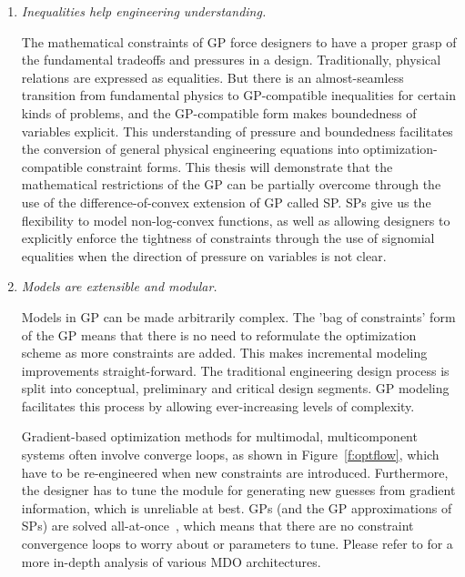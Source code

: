 \begin{enumerate}

    \item \textit{Inequalities help engineering understanding.}

    The mathematical constraints of \gls{GP} force designers to have a proper grasp
    of the fundamental tradeoffs and pressures in a design.
    Traditionally, physical relations are expressed as equalities. But there is an
    almost-seamless transition from fundamental physics to GP-compatible
    inequalities for certain kinds of problems, and the \gls{GP}-compatible
    form makes boundedness of variables explicit. This understanding of pressure
    and boundedness facilitates the conversion of general physical engineering
    equations into optimization-compatible constraint forms.
    This thesis will demonstrate that the mathematical restrictions of the \gls{GP} can be partially
    overcome through the use of the difference-of-convex
    extension of \gls{GP} called \gls{SP}. \gls{SP}s give us the flexibility to model
    non-log-convex functions, as well as allowing designers to explicitly enforce
    the tightness of
    constraints through the use of signomial equalities when the direction of pressure
    on variables is not clear.

    \item \textit{Models are extensible and modular.}

    Models in \gls{GP} can be made arbitrarily complex. The 'bag of constraints' form of the \gls{GP}
    means that there is no need to reformulate the optimization scheme as more
    constraints are added. This makes incremental modeling improvements straight-forward.
    The traditional engineering design process is split into conceptual, preliminary
    and critical design segments. \gls{GP} modeling facilitates this process by allowing
    ever-increasing levels of complexity.

    Gradient-based optimization methods for
    multimodal, multicomponent systems often involve
    converge loops, as shown in Figure~\ref{f:optflow}, which have to be re-engineered
    when new constraints are introduced. Furthermore, the designer has to tune
    the module for generating new guesses from gradient information, which is unreliable
    at best. \gls{GP}s (and the \gls{GP} approximations
    of \gls{SP}s) are solved all-at-once~\cite{martins_mdo}, which means that there are no constraint
    convergence loops to worry about or parameters to tune. Please refer to \cite{martins_mdo}
    for a more in-depth analysis of various \gls{MDO} architectures.


\end{enumerate}

